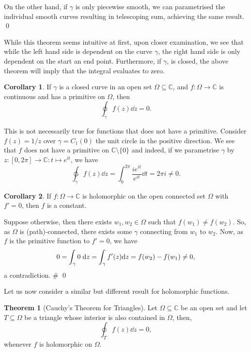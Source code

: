 \documentclass[
]{article}
\theoremstyle{definition}
\newtheorem{theorem}{Theorem}
\newtheorem{corollary}{Corollary}[theorem]
\theoremstyle{definition}
\begin{document}
On the other hand, if \(\gamma\) is only piecewise smooth, we can
parametrised the individual smooth curves resulting in telescoping sum,
achieving the same result. \qed

While this theorem seems intuitive at first, upon closer examination, we
see that while the left hand side is dependent on the curve \(\gamma\),
the right hand side is only dependent on the start an end point.
Furthermore, if \(\gamma\), is closed, the above theorem will imply that
the integral evaluates to zero.

\begin{corollary}
  If \(\gamma\) is a closed curve in an open set \(\Omega \subseteq \mathbb{C}\), 
  and \(f : \Omega \to \mathbb{C}\) is continuous and has a primitive on \(\Omega\),
  then
  \[\oint_\gamma f(z) \dd z = 0.\]
\end{corollary}

This is not necessarily true for functions that does not have a
primitive. Consider \(f(z) = 1 / z\) over \(\gamma = C_1(0)\) the unit
circle in the positive direction. We see that \(f\) does not have a
primitive on \(\mathbb{C}\setminus \{0\}\) and indeed, if we parametrise
\(\gamma\) by \(z : [0, 2\pi] \to \mathbb{C} : t \mapsto e^{it}\), we
have
\[\ointctrclockwise_\gamma f(z) \dd z = \int_0^{2\pi} \frac{i e^{it}}{e^{it}} \dd t = 2\pi i \neq 0.\]

\begin{corollary}
  If \(f : \Omega \to \mathbb{C}\) is holomorphic on the open connected set \(\Omega\) 
  with \(f' = 0\), then \(f\) is a constant.
\end{corollary}
\proof

Suppose otherwise, then there exists \(w_1, w_2 \in \Omega\) such that
\(f(w_1) \neq f(w_2)\). So, as \(\Omega\) is (path)-connected, there
exists some \(\gamma\) connecting from \(w_1\) to \(w_2\). Now, as \(f\)
is the primitive function to \(f' = 0\), we have
\[0 = \int_\gamma 0\hspace{1mm} \dd z = \int_\gamma f'(z) \dd z = f(w_2) - f(w_1) \neq 0,\]
a contradiction. \# \qed

Let us now consider a similar but different result for holomorphic
functions.

\begin{theorem}[Cauchy's Theorem for Triangles]
  Let \(\Omega \subseteq \mathbb{C}\) be an open set and let \(T \subseteq \Omega\) 
  be a triangle whose interior is also contained in \(\Omega\), then, 
  \[\oint_T f(z) \dd z = 0,\]
  whenever \(f\) is holomorphic on \(\Omega\).
\end{theorem}
\end{document}
